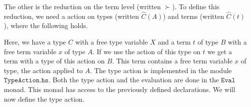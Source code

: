 \documentclass[a4paper,cleardoubleempty,BCOR1cm]{scrbook}
\begin{document}
The other is the reduction on the term level (written $\mathtt{\succ}$). To define this
reduction, we need a action on types (written \(\widehat{C}(A)\)) and terms
(written \(\widehat{C}(t)\)), where the following holds.
\begin{prooftree}
\end{prooftree}
Here, we have a type \(C\) with a free type variable \(X\) and a term \(t\) of type
\(B\) with a free term variable \(x\) of type \(A\). If we use the action of this
type on \(t\) we get a term with a type of this action on \(B\). This term
contains a free term variable \(x\) of type, the action applied to \(A\). The
type action is implemented in the module $\mathtt{TypeAction.hs}$. Both the type
action and the evaluation are done in the $\mathtt{Eval}$\;monad. This monad has access
to the previously defined declarations. We will now define the type action.
\end{document}
